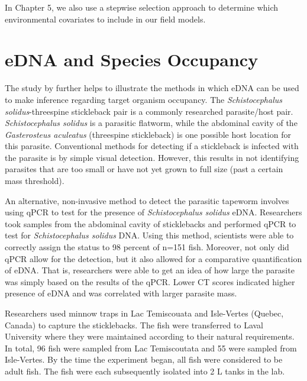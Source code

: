 \vspace{5mm}

In Chapter 5, we also use a stepwise selection approach to determine which environmental covariates to include in our field models.



\section{eDNA and Species Occupancy}
 
The study by \cite{parasite} further helps to illustrate the methods in which eDNA can be used to make inference regarding target organism occupancy. The \textit{Schistocephalus solidus}-threespine stickleback pair is a commonly researched parasite/host pair. \textit{Schistocephalus solidus} is a parasitic flatworm, while the abdominal cavity of the  \textit{Gasterosteus aculeatus} (threespine stickleback) is one possible host location for this parasite. Conventional  methods for detecting if a stickleback is infected with the parasite is by simple visual detection. However, this results in not identifying parasites that are too small or have not yet grown to full size (past a certain mass threshold). 


\vspace{5mm}

An alternative, non-invasive method to detect the parasitic tapeworm involves using qPCR to test for the presence of \textit{Schistocephalus solidus} eDNA. Researchers took samples from the abdominal cavity of sticklebacks and performed qPCR to test for \textit{Schistocephalus solidus} DNA. Using this method, scientists were able to correctly assign the status to 98 percent of n=151 fish.
Moreover, not only did qPCR allow for the detection, but it also allowed for a comparative quantification of eDNA. That is, researchers were able to get an idea of how large the parasite was simply based on the results of the qPCR. Lower CT scores indicated higher presence of eDNA and was correlated with larger parasite mass. 

\vspace{6mm}

Researchers used minnow traps in Lac Temiscouata and Isle-Vertes (Quebec, Canada) to capture the sticklebacks. The fish were transferred to Laval University where they were maintained according to their natural requirements. In total, 96 fish were sampled from Lac Temiscoutata and 55 were sampled from Isle-Vertes. By the time the experiment began, all fish were considered to be adult fish. The fish were each subsequently isolated into 2 L tanks in the lab.

